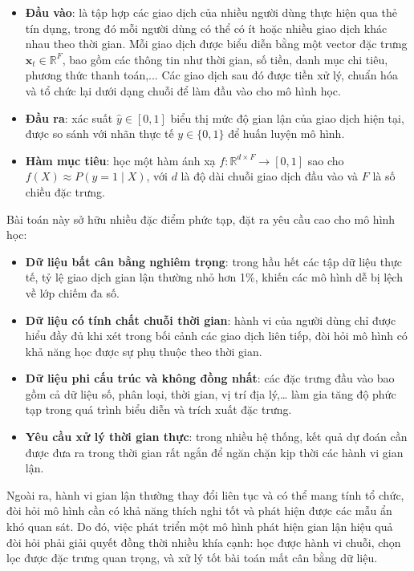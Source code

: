 \begin{itemize}
    \item \textbf{Đầu vào}: là tập hợp các giao dịch của nhiều người dùng thực hiện qua thẻ tín dụng, trong đó mỗi người dùng có thể có ít hoặc nhiều giao dịch khác nhau theo thời gian. Mỗi giao dịch được biểu diễn bằng một vector đặc trưng $\mathbf{x}_t \in \mathbb{R}^F$, bao gồm các thông tin như thời gian, số tiền, danh mục chi tiêu, phương thức thanh toán,... Các giao dịch sau đó được tiền xử lý, chuẩn hóa và tổ chức lại dưới dạng chuỗi để làm đầu vào cho mô hình học.
    
    \item \textbf{Đầu ra}: xác suất $\hat{y} \in [0,1]$ biểu thị mức độ gian lận của giao dịch hiện tại, được so sánh với nhãn thực tế $y \in \{0,1\}$ để huấn luyện mô hình.
    
    \item \textbf{Hàm mục tiêu}: học một hàm ánh xạ $f: \mathbb{R}^{d \times F} \rightarrow [0,1]$ sao cho $f(X) \approx P(y = 1 \mid X)$, với $d$ là độ dài chuỗi giao dịch đầu vào và $F$ là số chiều đặc trưng.
\end{itemize}

Bài toán này sở hữu nhiều đặc điểm phức tạp, đặt ra yêu cầu cao cho mô hình học:

\begin{itemize}
    \item \textbf{Dữ liệu bất cân bằng nghiêm trọng}: trong hầu hết các tập dữ liệu thực tế, tỷ lệ giao dịch gian lận thường nhỏ hơn 1\%, khiến các mô hình dễ bị lệch về lớp chiếm đa số.
    
    \item \textbf{Dữ liệu có tính chất chuỗi thời gian}: hành vi của người dùng chỉ được hiểu đầy đủ khi xét trong bối cảnh các giao dịch liên tiếp, đòi hỏi mô hình có khả năng học được sự phụ thuộc theo thời gian.
    
    \item \textbf{Dữ liệu phi cấu trúc và không đồng nhất}: các đặc trưng đầu vào bao gồm cả dữ liệu số, phân loại, thời gian, vị trí địa lý,… làm gia tăng độ phức tạp trong quá trình biểu diễn và trích xuất đặc trưng.
    
    \item \textbf{Yêu cầu xử lý thời gian thực}: trong nhiều hệ thống, kết quả dự đoán cần được đưa ra trong thời gian rất ngắn để ngăn chặn kịp thời các hành vi gian lận.
\end{itemize}

Ngoài ra, hành vi gian lận thường thay đổi liên tục và có thể mang tính tổ chức, đòi hỏi mô hình cần có khả năng thích nghi tốt và phát hiện được các mẫu ẩn khó quan sát. Do đó, việc phát triển một mô hình phát hiện gian lận hiệu quả đòi hỏi phải giải quyết đồng thời nhiều khía cạnh: học được hành vi chuỗi, chọn lọc được đặc trưng quan trọng, và xử lý tốt bài toán mất cân bằng dữ liệu.


